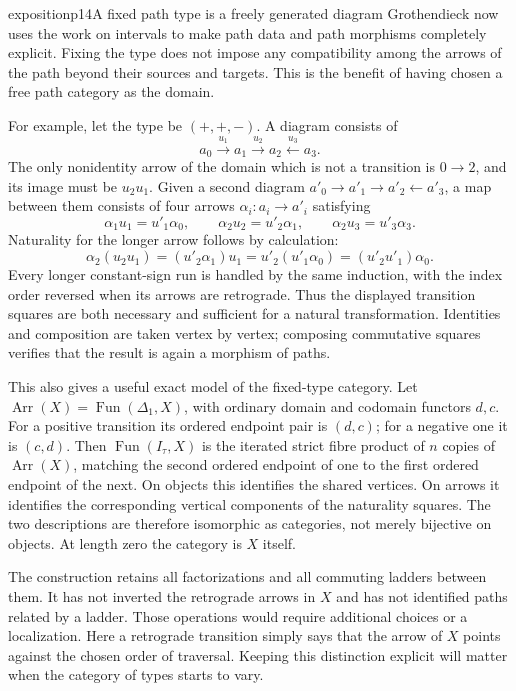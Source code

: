 \begin{dcomment}{exposition}{p14}{A fixed path type is a freely generated diagram}
Grothendieck now uses the work on intervals to make path data and path morphisms completely explicit. Fixing the type does not impose any compatibility among the arrows of the path beyond their sources and targets. This is the benefit of having chosen a free path category as the domain.

For example, let the type be $(+,+,-)$. A diagram consists of
\[
 a_0\xrightarrow{u_1}a_1\xrightarrow{u_2}a_2
       \xleftarrow{u_3}a_3.
\]
The only nonidentity arrow of the domain which is not a transition is $0\to2$, and its image must be $u_2u_1$. Given a second diagram $a'_0\to a'_1\to a'_2\leftarrow a'_3$, a map between them consists of four arrows $\alpha_i:a_i\to a'_i$ satisfying
\[
 \alpha_1u_1=u'_1\alpha_0,\qquad
 \alpha_2u_2=u'_2\alpha_1,\qquad
 \alpha_2u_3=u'_3\alpha_3.
\]
Naturality for the longer arrow follows by calculation:
\[
 \alpha_2(u_2u_1)
 =(u'_2\alpha_1)u_1
 =u'_2(u'_1\alpha_0)
 =(u'_2u'_1)\alpha_0.
\]
Every longer constant-sign run is handled by the same induction, with the index order reversed when its arrows are retrograde. Thus the displayed transition squares are both necessary and sufficient for a natural transformation. Identities and composition are taken vertex by vertex; composing commutative squares verifies that the result is again a morphism of paths.

This also gives a useful exact model of the fixed-type category. Let $\operatorname{Arr}(X)=\operatorname{Fun}(\Delta_1,X)$, with ordinary domain and codomain functors $d,c$. For a positive transition its ordered endpoint pair is $(d,c)$; for a negative one it is $(c,d)$. Then $\operatorname{Fun}(I_\tau,X)$ is the iterated strict fibre product of $n$ copies of $\operatorname{Arr}(X)$, matching the second ordered endpoint of one to the first ordered endpoint of the next. On objects this identifies the shared vertices. On arrows it identifies the corresponding vertical components of the naturality squares. The two descriptions are therefore isomorphic as categories, not merely bijective on objects. At length zero the category is $X$ itself.

The construction retains all factorizations and all commuting ladders between them. It has not inverted the retrograde arrows in $X$ and has not identified paths related by a ladder. Those operations would require additional choices or a localization. Here a retrograde transition simply says that the arrow of $X$ points against the chosen order of traversal. Keeping this distinction explicit will matter when the category of types starts to vary.
\end{dcomment}

